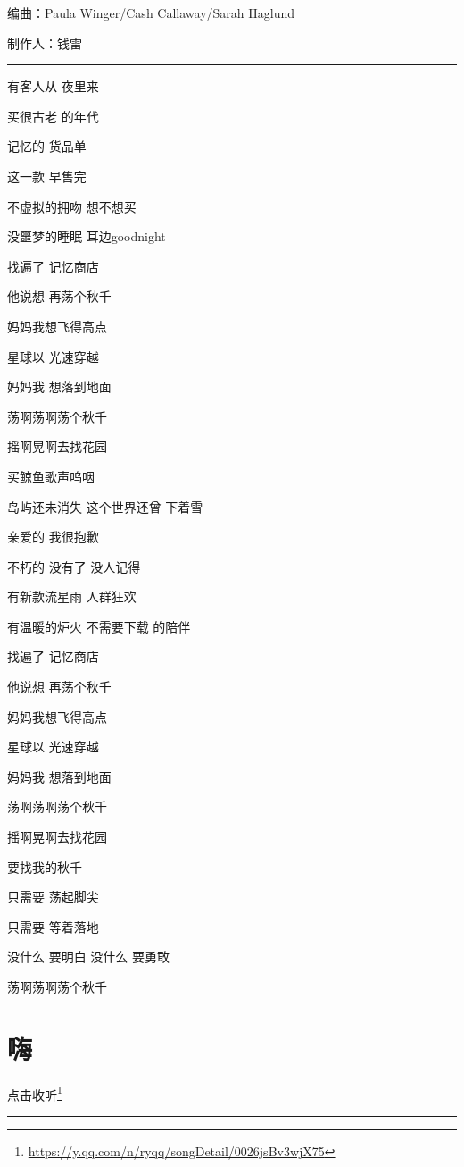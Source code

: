 \documentclass[]{ctexbook}
\renewcommand{\href}[2]{#2\footnote{\url{#1}}}
\begin{document}
编曲：Paula Winger/Cash Callaway/Sarah Haglund

制作人：钱雷

\begin{center}\rule{0.5\linewidth}{0.5pt}\end{center}

有客人从 夜里来

买很古老 的年代

记忆的 货品单

这一款 早售完

不虚拟的拥吻 想不想买

没噩梦的睡眠 耳边goodnight

找遍了 记忆商店

他说想 再荡个秋千

妈妈我想飞得高点

星球以 光速穿越

妈妈我 想落到地面

荡啊荡啊荡个秋千

摇啊晃啊去找花园

买鲸鱼歌声呜咽

岛屿还未消失 这个世界还曾 下着雪

亲爱的 我很抱歉

不朽的 没有了 没人记得

有新款流星雨 人群狂欢

有温暖的炉火 不需要下载 的陪伴

找遍了 记忆商店

他说想 再荡个秋千

妈妈我想飞得高点

星球以 光速穿越

妈妈我 想落到地面

荡啊荡啊荡个秋千

摇啊晃啊去找花园

要找我的秋千

只需要 荡起脚尖

只需要 等着落地

没什么 要明白 没什么 要勇敢

荡啊荡啊荡个秋千

\section*{嗨}\label{say-hi}


\href{https://y.qq.com/n/ryqq/songDetail/0026jsBv3wjX75}{点击收听}

\begin{center}\rule{0.5\linewidth}{0.5pt}\end{center}
\end{document}
